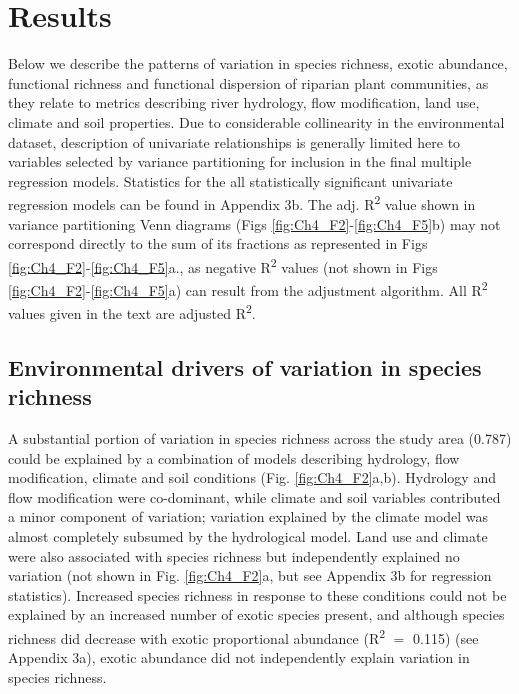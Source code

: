 \documentclass[openright,12pt,a4paper]{memoir}
\begin{document}
\section{Results}
Below we describe the patterns of variation in species richness, exotic abundance, functional richness and functional dispersion of riparian plant communities, as they relate to metrics describing river hydrology, flow modification, land use, climate and soil properties.  
Due to considerable collinearity in the environmental dataset, description of univariate relationships is generally limited here to variables selected by variance partitioning for inclusion in the final multiple regression models. Statistics for the all statistically significant univariate regression models can be found in Appendix 3b. The adj. R\textsuperscript{2} value shown in variance partitioning Venn diagrams (Figs \ref{fig:Ch4_F2}-\ref{fig:Ch4_F5}b) may not correspond directly to the sum of its fractions as represented in Figs \ref{fig:Ch4_F2}-\ref{fig:Ch4_F5}a., as negative R\textsuperscript{2} values (not shown in Figs \ref{fig:Ch4_F2}-\ref{fig:Ch4_F5}a) can result from the adjustment algorithm. All R\textsuperscript{2} values given in the text are adjusted R\textsuperscript{2}. 

\subsection{Environmental drivers of variation in species richness}
A substantial portion of variation in species richness across the study area (0.787) could be explained by a combination of models describing hydrology, flow modification, climate and soil conditions (Fig. \ref{fig:Ch4_F2}a,b). Hydrology and flow modification were co-dominant, while climate and soil variables contributed a minor component of variation; variation explained by the climate model was almost completely subsumed by the hydrological model. Land use and climate were also associated with species richness but independently explained no variation (not shown in Fig. \ref{fig:Ch4_F2}a, but see Appendix 3b for regression statistics). Increased species richness in response to these conditions could not be explained by an increased number of exotic species present, and although species richness did decrease with exotic proportional abundance (R\textsuperscript{2}  $=$ 0.115) (see Appendix 3a), exotic abundance did not independently explain variation in species richness.
\end{document}
